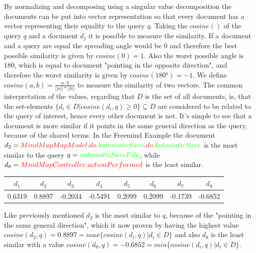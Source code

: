 By normalizing and decomposing using a singular value decomposition the documents can be put into vector representation so that every document has a vector representing their equality to the query $q$. Taking the $cosine()$ of the query $q$ and a document $d_j$ it is possible to measure the similarity. If a document and a query are equal the spreading angle would be $0$ and therefore the best possible similarity is given by $cosine(0)=1$. Also the worst possible angle is $180$, which is equal to document "pointing in the opposite direction", and therefore the worst similarity is given by $cosine(180°)=-1$. We define $cosine(a,b)=\frac{a \cdot b}{||a||*||b||}$ to measure the similarity of two vectors. The common interpretation of the values, regarding that $D$ is the set of all documents, is, that the set-elements $\{d_i \in D| cosine(d_i,q) \ge 0 \} \subseteq D$ are considered to be related to the query of interest, hence every other document is not. It's simple to see that a document is more similar if it points in the same general direction as the query, because of the shared terms. In the Freemind Example the document $d_2=\color{red}MindMapMapModel\color{black}.\color{red}do\color{green}AutomaticSave\color{black}.\color{red}do\color{green}AutomaticSave\color{black}$ is the most similar to the query $q=\color{green}automaticSaveFile\color{black}$, while $d_8=\color{red}MindMapController\color{black}.\color{red}actionPerformed\color{black}$ is the least similar.
\begin{center}
  \begin{tabular}{ c c c c c c c c }
    \hline
    $d_1$ & $d_2$ & $d_3$ & $d_4$ & $d_5$ & $d_6$ & $d_7$ & $d_8$ \\ \hline
    0.6319 & 0.8897 & -0.2034 & -0.5491 & 0.2099 & 0.2099 & -0.1739 & -0.6852 \\ \hline
  \end{tabular}
  \label{table:lsi-values}
\end{center}
Like previously mentioned $d_2$ is the most similar to $q$, because of the "pointing in the same general direction", which it now proven by having the highest value $cosine(d_2,q)=0.8897=max \{ cosine(d_i,q) | d_i \in D \} $ and also $d_8$ is the least similar with a value $cosine(d_8,q)=-0.6852=min\{cosine(d_i,q) | d_i \in D\}$.
  

